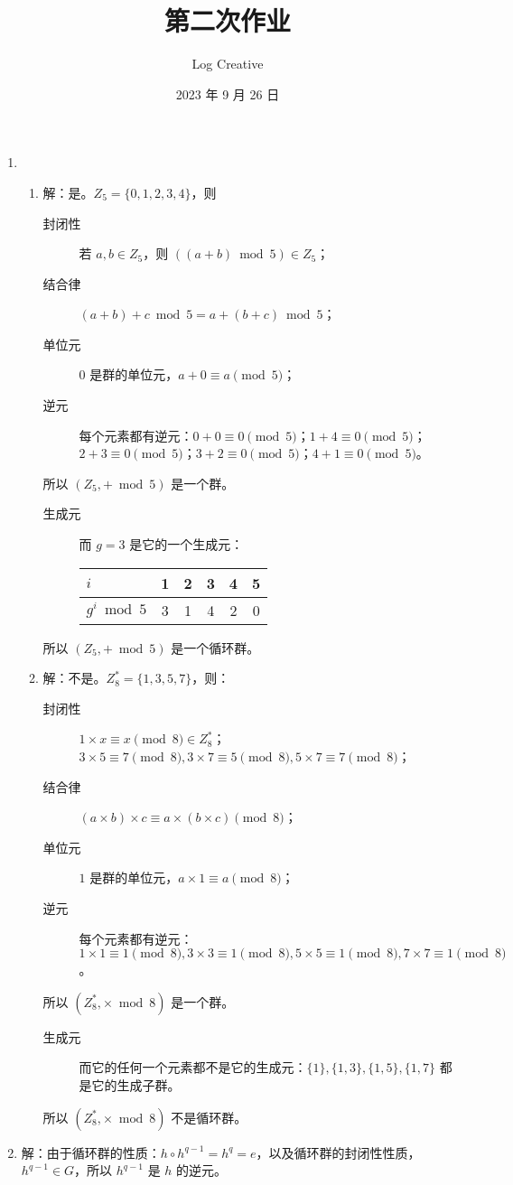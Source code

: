 \documentclass{sjtuarticle}
\title{第二次作业}
\author{Log Creative}
\date{2023 年 9 月 26 日}
\begin{document}
\maketitle
\begin{enumerate}
    \item 
    \begin{enumerate}
        \item 解：是。$Z_5=\{0,1,2,3,4\}$，则
        \begin{description}
            \item[封闭性] 若 $a,b\in Z_5$，则 $((a+b)\bmod 5)\in Z_5$；
            \item[结合律] $(a+b)+c \bmod 5 = a+(b+c) \bmod 5$；
            \item[单位元] $0$ 是群的单位元，$a+0\equiv a\pmod{5}$；
            \item[逆元] 每个元素都有逆元：$0+0\equiv 0\pmod{5}$；$1+4\equiv 0\pmod{5}$；$2+3\equiv 0\pmod{5}$；$3+2\equiv 0\pmod{5}$；$4+1\equiv 0\pmod{5}$。
        \end{description}
        所以 $(Z_5, +\bmod 5)$ 是一个群。
        \begin{description}
            \item[生成元] 而 $g=3$ 是它的一个生成元：

            \begin{tabular}{l|c|c|c|c|c}
                $i$            & 1 & 2 & 3 & 4 & 5 \\
                \hline
                $g^i \bmod 5$  & 3 & 1 & 4 & 2 & 0 \\
            \end{tabular}
        \end{description}
        所以 $(Z_5, +\bmod 5)$ 是一个循环群。
        \item 解：不是。$Z_8^*=\{1,3,5,7\}$，则：
        \begin{description}
            \item[封闭性] $1\times x\equiv x \pmod{8}\in Z_8^*$；$3\times 5\equiv 7\pmod{8}, 3\times 7\equiv 5\pmod{8}, 5\times 7\equiv 7\pmod{8}$；
            \item[结合律] $(a\times b)\times c\equiv a\times (b\times c)\pmod{8}$；
            \item[单位元] $1$ 是群的单位元，$a\times 1 \equiv a\pmod{8}$；
            \item[逆元] 每个元素都有逆元：$1\times 1 \equiv 1\pmod{8}, 3\times 3\equiv 1\pmod{8}, 5\times 5\equiv 1\pmod{8}, 7\times 7\equiv 1\pmod{8}$。  
        \end{description}
        所以 $(Z_8^*,\times \bmod 8)$ 是一个群。
        \begin{description}
            \item[生成元] 而它的任何一个元素都不是它的生成元：$\{1\},\{1,3\},\{1,5\},\{1,7\}$ 都是它的生成子群。
        \end{description}
        所以 $(Z_8^*,\times \bmod 8)$ 不是循环群。
    \end{enumerate}
    \item 解：由于循环群的性质：$h\circ h^{q-1}=h^q=e$，以及循环群的封闭性性质，$h^{q-1}\in G$，所以 $h^{q-1}$ 是 $h$ 的逆元。
    

\end{enumerate}
\end{document}
